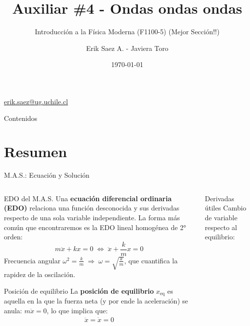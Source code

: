 \documentclass[
    10pt,
    aspectratio=169,
    xcolor={dvipsnames},
    spanish,
    ]{beamer}
\title[Auxiliar \#4 - Ondas ondas ondas]{\bfseries Auxiliar \#4 - Ondas ondas ondas}
\subtitle{Introducción a la Física Moderna (F1100-5) (Mejor Sección!!)}
\author[Erik Saez A.]{Erik Saez A. - Javiera Toro}
\institute[UChile]{Departamento de Ingeniería Eléctrica \\ Universidad de Chile}
\date{\today}
\begin{document}
\begin{frame}
  \titlepage
  \centering
   \href{mailto:erik.saez@ug.uchile.cl}{erik.saez@ug.uchile.cl} \hspace{.2cm}
\end{frame}

\begin{frame}{Contenidos}
  \tableofcontents
\end{frame}

\section{Resumen}

\begin{frame}{M.A.S.: Ecuación y Solución}
  \footnotesize
  \begin{columns}[T]
    \begin{column}{0.58\textwidth}
      \begin{block}{EDO del M.A.S.}
        Una \textbf{ecuación diferencial ordinaria (EDO)} relaciona una función   desconocida y sus derivadas respecto de una sola variable independiente. La forma más común que encontraremos es la EDO lineal homogénea de 2° orden:
        \begin{equation*}
          m\ddot x + kx = 0 \;\Longleftrightarrow\; \ddot x + \frac{k}{m}x = 0
        \end{equation*}
        \noindent Frecuencia angular $\omega^2=\tfrac{k}{m} \;\Rightarrow\; \omega=\sqrt{\tfrac{k}{m}}$, que cuantifica la rapidez de la oscilación.\vspace{-2pt}
      \end{block}
      \begin{block}{Posición de equilibrio}
        La \textbf{posición de equilibrio} $x_{\text{eq}}$ es aquella en la que la fuerza neta (y por ende la aceleración) se anula: $m\ddot x=0$, lo que implica que:\begin{align}
          \ddot{x}= \dot{x} = 0
        \end{align}
      \end{block}
    \end{column}
    \begin{column}{0.45\textwidth}
      \begin{block}{Derivadas útiles}
        Cambio de variable respecto al equilibrio:\\[-2pt]
        \[
          \begin{aligned}

\end{aligned}\]
\end{block}
\end{column}
\end{columns}
\end{frame}
\end{document}
